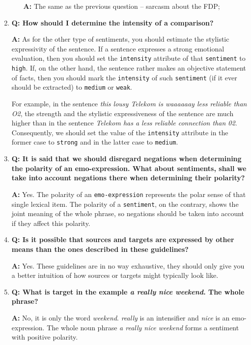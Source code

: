 \documentclass[11pt,a4paper]{article}
\theoremstyle{mytheoremstyle}
\begin{document}
\begin{enumerate}
\begin{itemize}
    \textbf{A:} The same as the previous question -- sarcasm about the
    FDP;
  \end{itemize}

\item\textbf{Q: How should I determine the intensity of a comparison?}

  \textbf{A:} As for the other type of sentiments, you should estimate
  the stylistic expressivity of the sentence.  If a sentence expresses
  a strong emotional evaluation, then you should set the
  \texttt{intensity} attribute of that \texttt{sentiment} to
  \texttt{high}.  If, on the other hand, the sentence rather makes an
  objective statement of facts, then you should mark the
  \texttt{intensity} of such \texttt{sentiment} (if it ever should be
  extracted) to \texttt{medium} or \texttt{weak}.

  For example, in the sentence \textit{this lousy Telekom is waaaaaay
    less reliable than O2}, the strength and the stylistic
  expressiveness of the sentence are much higher than in the sentence
  \textit{Telekom has a less reliable connection than 02}.
  Consequently, we should set the value of the \texttt{intensity}
  attribute in the former case to \texttt{strong} and in the latter
  case to \texttt{medium}.

\item\textbf{Q: It is said that we should disregard negations when
  determining the polarity of an emo-expression.  What about
  sentiments, shall we take into account negations there when
  determining their polarity?}

  \textbf{A:} Yes.  The polarity of an \texttt{emo-expression}
  represents the polar sense of that single lexical item.  The
  polarity of a \texttt{sentiment}, on the contrary, shows the joint
  meaning of the whole phrase, so negations should be taken into
  account if they affect this polarity.

\item\textbf{Q: Is it possible that sources and targets are expressed
  by other means than the ones described in these guidelines?}

  \textbf{A:} Yes. These guidelines are in no way exhaustive, they
  should only give you a better intuition of how sources or targets
  might typically look like.

\item\textbf{Q: What is target in the example \textit{a really nice
    weekend}.  The whole phrase?}

  \textbf{A:} No, it is only the word
  \textit{weekend}. \textit{really} is an intensifier and
  \textit{nice} is an emo-expression.  The whole noun phrase \textit{a
    really nice weekend} forms a sentiment with positive polarity.


\end{enumerate}
\end{document}
